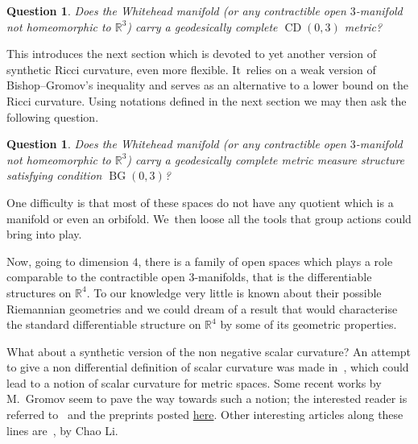 \documentclass[10pt,a4paper]{amsart}
\numberwithin{equation}{section}
\newtheorem{question}[theor]{Question}
\newcommand{\CDCD}{\operatorname{CD}}
\newcommand{\BG}{\operatorname{BG}}
\begin{document}
\begin{question}
Does the Whitehead manifold (or any contractible open $3$-manifold not homeo\-morphic to $\mathbb R^3$) carry a geodesically complete $\CDCD (0, 3)$ metric?
\end{question}

This introduces the next section which is devoted to yet another version of synthetic Ricci curvature, even more flexible. It~relies on a weak version of Bishop--Gromov's inequality and serves as an alternative to a lower bound on the Ricci curvature. Using notations defined in the next section we may then ask the following question.

\begin{question}
Does the Whitehead manifold (or any contractible open $3$-manifold not homeo\-morphic to $\mathbb R^3$) carry a geodesically complete metric measure
structure satisfying condition $\BG (0, 3)$?
\end{question}

One difficulty is that most of these spaces do not have any quotient which is a manifold or even an orbifold. We~then loose all the tools that group actions could bring into play.

Now, going to dimension $4$, there is a family of open spaces which plays
a role comparable to the contractible open $3$-manifolds, that is the differentiable structures on $\mathbb R^4$. To our knowledge very little is known about their possible Riemannian geometries and we could dream of a result that would characterise the standard differentiable structure on $\mathbb R^4$ by some of its geometric properties.

What about a synthetic version of the non negative scalar curvature? An attempt to give a non differential definition of scalar curvature was made in~\cite{Vero}, which could lead to a notion of scalar curvature for metric spaces. Some recent works by M.~Gromov seem to pave the way towards such a notion; the interested reader is referred to~\cite{Misha2, Misha1}
and the preprints posted \href{https://www.ihes.fr/~gromov/category/positivescalarcurvature/}{here}. Other interesting articles along these lines are~\cite{ChaoLi2, ChaoLi1}, by Chao Li.
\end{document}

